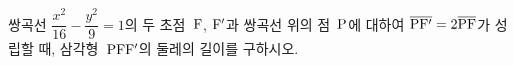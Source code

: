 쌍곡선 $\dfrac{x^2}{16}-\dfrac{y^2}{9}=1$의 두 초점~$\mathrm{F}$, $\mathrm{F}'$과 쌍곡선 위의 점~$\mathrm{P}$에 대하여 $\overline{\mathrm{PF'}}=2\overline{\mathrm{PF}}$가 성립할 때, 삼각형~$\mathrm{PFF'}$의 둘레의 길이를 구하시오.
